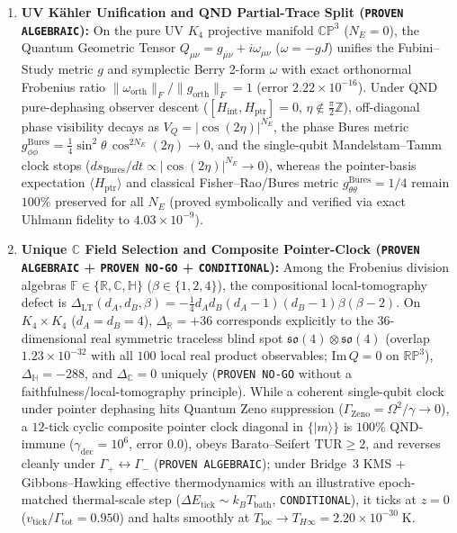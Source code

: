 \documentclass[11pt,a4paper]{article}
\begin{document}
\begin{enumerate}\setlength{\itemsep}{2pt}
\item \textbf{UV K\"ahler Unification and QND Partial-Trace Split (\texttt{PROVEN ALGEBRAIC}):} On the pure UV $K_4$ projective manifold $\mathbb{CP}^3$ ($N_E=0$), the Quantum Geometric Tensor $Q_{\mu\nu} = g_{\mu\nu} + i\omega_{\mu\nu}$ ($\omega = -g J$) unifies the Fubini--Study metric $g$ and symplectic Berry 2-form $\omega$ with exact orthonormal Frobenius ratio $\|\omega_{\mathrm{orth}}\|_F/\|g_{\mathrm{orth}}\|_F = 1$ (error $2.22\times 10^{-16}$). Under QND pure-dephasing observer descent ($[H_{\mathrm{int}}, H_{\mathrm{ptr}}]=0$, $\eta \notin \frac{\pi}{2}\mathbb{Z}$), off-diagonal phase visibility decays as $V_Q = |\cos(2\eta)|^{N_E}$, the phase Bures metric $g_{\phi\phi}^{\mathrm{Bures}} = \frac{1}{4}\sin^2\theta\,\cos^{2N_E}(2\eta)\to 0$, and the single-qubit Mandelstam--Tamm clock stops ($ds_{\mathrm{Bures}}/dt \propto |\cos(2\eta)|^{N_E}\to 0$), whereas the pointer-basis expectation $\langle H_{\mathrm{ptr}}\rangle$ and classical Fisher--Rao/Bures metric $g_{\theta\theta}^{\mathrm{Bures}} = 1/4$ remain $100\%$ preserved for all $N_E$ (proved symbolically and verified via exact Uhlmann fidelity to $4.03\times 10^{-9}$).
\item \textbf{Unique $\mathbb{C}$ Field Selection and Composite Pointer-Clock (\texttt{PROVEN ALGEBRAIC} + \texttt{PROVEN NO-GO} + \texttt{CONDITIONAL}):} Among the Frobenius division algebras $\mathbb{F}\in\{\mathbb{R},\mathbb{C},\mathbb{H}\}$ ($\beta\in\{1,2,4\}$), the compositional local-tomography defect is $\Delta_{\mathrm{LT}}(d_A,d_B,\beta) = -\frac{1}{4}d_A d_B(d_A-1)(d_B-1)\beta(\beta-2)$. On $K_4\times K_4$ ($d_A=d_B=4$), $\Delta_{\mathbb{R}} = +36$ corresponds explicitly to the $36$-dimensional real symmetric traceless blind spot $\mathfrak{so}(4)\otimes\mathfrak{so}(4)$ (overlap $1.23\times 10^{-32}$ with all $100$ local real product observables; $\mathrm{Im}\,Q=0$ on $\mathbb{RP}^3$), $\Delta_{\mathbb{H}}=-288$, and $\Delta_{\mathbb{C}}=0$ uniquely (\texttt{PROVEN NO-GO} without a faithfulness/local-tomography principle). While a coherent single-qubit clock under pointer dephasing hits Quantum Zeno suppression ($\Gamma_{\mathrm{Zeno}}=\Omega^2/\gamma\to 0$), a $12$-tick cyclic composite pointer clock diagonal in $\{|m\rangle\}$ is $100\%$ QND-immune ($\gamma_{\mathrm{dec}}=10^6$, error $0.0$), obeys Barato--Seifert $\mathrm{TUR}\ge 2$, and reverses cleanly under $\Gamma_+\leftrightarrow\Gamma_-$ (\texttt{PROVEN ALGEBRAIC}); under Bridge~3 KMS + Gibbons--Hawking effective thermodynamics with an illustrative epoch-matched thermal-scale step ($\Delta E_{\mathrm{tick}}\sim k_B T_{\mathrm{bath}}$, \texttt{CONDITIONAL}), it ticks at $z=0$ ($v_{\mathrm{tick}}/\Gamma_{\mathrm{tot}}=0.950$) and halts smoothly at $T_{\mathrm{loc}}\to T_{H\infty}=2.20\times 10^{-30}\;\mathrm{K}$.

\end{enumerate}
\end{document}
